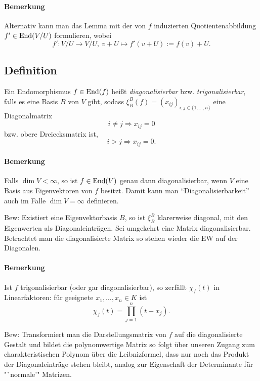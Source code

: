 \paragraph{Bemerkung}
	Alternativ kann man das Lemma mit der von $ f $ induzierten Quotientenabbildung $ f'\in \operatorname{End}(V/U) $ formulieren, wobei
		\[ f':V/U\to V/U,\ v+U\mapsto f'(v+U) := f(v)+U. \]
\subsection{Definition}
\begin{Definition}
	Ein Endomorphismus $ f\in\operatorname{End}(f) $ heißt \emph{diagonalisierbar} bzw. \emph{trigonalisierbar}, falls es eine Basis $ B $ von $ V $ gibt, sodass $ \xi_B^B(f)=(x_{ij})_{i,j\in\{1,\dots,n\}} $ eine Diagonalmatrix 
		\[ i\neq j\Rightarrow x_{ij} = 0 \]
	bzw. obere Dreiecksmatrix ist,
		\[ i>j \Rightarrow x_{ij} = 0. \]
\end{Definition}
\paragraph{Bemerkung}
	Falls $ \dim V<\infty $, so ist $ f\in\operatorname{End}(V) $ genau dann diagonalisierbar, wenn $ V $ eine Basis aus Eigenvektoren von $ f $ besitzt. Damit kann man "`Diagonalisierbarkeit"' auch im Falle $ \dim V=\infty $ definieren.
	
	Bew: Existiert eine Eigenvektorbasis $B$, so ist $\xi_B^B$ klarerweise diagonal, mit den Eigenwerten als Diagonaleinträgen.
	Sei umgekehrt eine Matrix diagonalisierbar. Betrachtet man die diagonalisierte Matrix so stehen wieder die EW auf der Diagonalen.
	
	
\paragraph{Bemerkung}
	Ist $ f $ trigonalisierbar (oder gar diagonalisierbar), so zerfällt $ \chi_f (t) $ in Linearfaktoren: für geeignete $ x_1,\dots,x_n\in K $ ist
		\[ \chi_f(t)=\prod_{j=1}^{n}(t-x_j). \]
	
	Bew: Transformiert man die Darstellungsmatrix von $f$ auf die diagonalisierte Gestalt und bildet die polynomwertige Matrix so folgt über unseren Zugang zum charakteristischen Polynom über die Leibnizformel, dass nur noch das Produkt der Diagonaleinträge stehen bleibt, analog zur Eigenschaft der Determinante für "`normale'" Matrizen.

